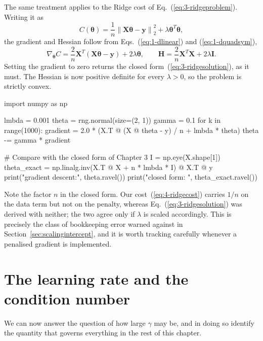 The same treatment applies to the Ridge cost of Eq.~(\ref{eq:3-ridgeproblem}).
Writing it as
\begin{equation}
  C(\bm{\theta}) = \frac{1}{n}\left\|\bm{X}\bm{\theta}-\bm{y}\right\|_2^{2}
                 + \lambda\bm{\theta}^{T}\bm{\theta},
  \label{eq:4-ridgecost}
\end{equation}
the gradient and Hessian follow from
Eqs.~(\ref{eq:1-dlinear}) and (\ref{eq:1-dquadsym}),
\begin{equation}
  \nabla_{\bm{\theta}}C
   = \frac{2}{n}\bm{X}^{T}\left(\bm{X}\bm{\theta}-\bm{y}\right)
     + 2\lambda\bm{\theta},
  \qquad
  \bm{H} = \frac{2}{n}\bm{X}^{T}\bm{X} + 2\lambda\bm{I} .
  \label{eq:4-ridgegradhess}
\end{equation}
Setting the gradient to zero returns the closed
form~(\ref{eq:3-ridgesolution}), as it must.  The Hessian is now positive
definite for every $\lambda>0$, so the problem is strictly convex.

\begin{Python}{}
import numpy as np

lmbda = 0.001
theta = rng.normal(size=(2, 1))
gamma = 0.1
for k in range(1000):
    gradient = 2.0 * (X.T @ (X @ theta - y) / n + lmbda * theta)
    theta -= gamma * gradient

# Compare with the closed form of Chapter 3
I = np.eye(X.shape[1])
theta_exact = np.linalg.inv(X.T @ X + n * lmbda * I) @ X.T @ y
print("gradient descent:", theta.ravel())
print("closed form:     ", theta_exact.ravel())
\end{Python}

Note the factor $n$ in the closed form.  Our cost~(\ref{eq:4-ridgecost})
carries $1/n$ on the data term but not on the penalty, whereas
Eq.~(\ref{eq:3-ridgesolution}) was derived with neither; the two agree only if
$\lambda$ is scaled accordingly.  This is precisely the class of bookkeeping
error warned against in Section~\ref{sec:scalingintercept}, and it is worth
tracking carefully whenever a penalised gradient is implemented.

\section{The learning rate and the condition number}
\label{sec:learningrate}

We can now answer the question of how large $\gamma$ may be, and in doing so
identify the quantity that governs everything in the rest of this chapter.

